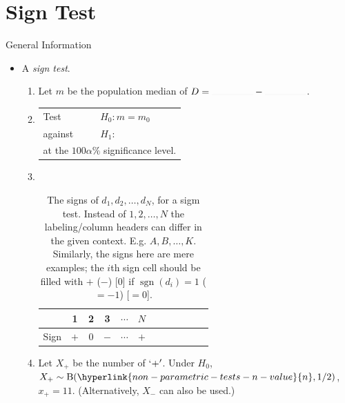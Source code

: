 \documentclass[../Notes.tex]{subfiles}
\begin{document}
\section{Sign Test}
\begin{stbox}{General Information}
  \begin{itemize}
    \item A \emph{sign test}.
    \begin{enumerate}
      \item Let \(m\) be the population median of \(D=\rule{1.5cm}{0.01mm}-\rule{1.5cm}{0.01mm}\).
      \item 
      \begin{tabular}{|ll|}
        \hline
        Test & \(H_0\colon m=m_0\)\\
        against &\(H_1\colon\) 
        \begin{enumerate*}[itemjoin={\quad}]
          \item \(m<m_0\),
          \item \(m\neq m_0\),\quad or
          \item \(m>m_0\),
        \end{enumerate*}\\
        \multicolumn{2}{|l|}{at the \(100\alpha\%\) significance level.}\\
        \hline
      \end{tabular}
      \item ~
      \begin{table}[H]
        \centering
        \begin{tabular}{|Sc|Sc|Sc|Sc|Sc|Sc|}
           & 1 & 2 & 3 & \(\cdots\) & \(N\)\\
          \hline 
          Sign & \(+\) & \(0\) & \(-\) & \(\cdots\) & \(+\)\\
          \hline
        \end{tabular}
        \caption{The signs of \(d_1,d_2,\dots,d_N\), for a sigm test. Instead of \(1,2,\dots,N\) the labeling/column headers can differ in the given context. E.g. \(A,B,\dots,K\). Similarly, the signs here are mere examples; the \(i\)th sign cell should be filled with \(+\) (\(-\)) [0] if \(\operatorname{sgn}(d_i)=1\) (\(=-1\)) [\(=0\)].}
        \label{table:sign-test-working-table}
      \end{table}
      \item Let \(X_{+}\) be the number of \(`+'\). Under \(H_0\), \(X_{+}\sim\Binom(\hyperlink{non-parametric-tests-n-value}{n},1/2)\), \(x_{+}=11\). (Alternatively, \(X_{-}\) can also be used.)

\end{enumerate}
\end{itemize}
\end{stbox}
\end{document}
